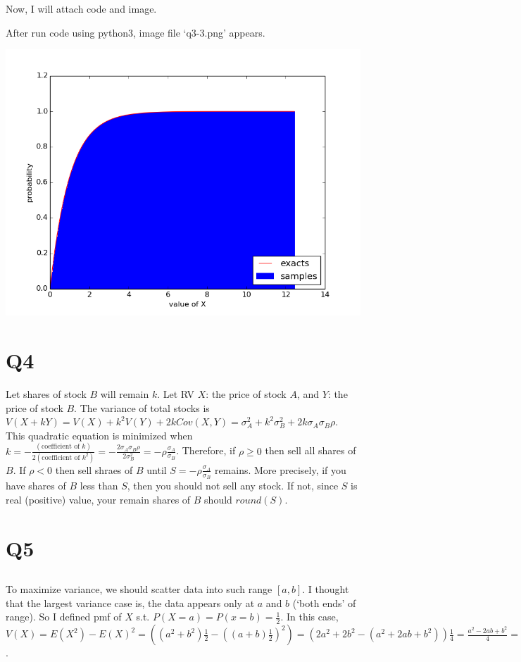 \documentclass{article}
\begin{document}
Now, I will attach code and image.



After run code using python3, image file `q3-3.png' appears.

\includegraphics{./q3-3.png}

\section{Q4}
Let shares of stock $B$ will remain $k$.
Let RV $X$: the price of stock $A$, and $Y$: the price of stock $B$.
The variance of total stocks is
$V(X+kY) = V(X) + k^2V(Y) + 2kCov(X,Y)
= \sigma_A^2 + k^2\sigma_B^2 + 2k\sigma_A\sigma_B\rho$.
This quadratic equation is minimized when
$k=-\frac{(\text{coefficient of }k)}{2(\text{coefficient of }k^2)}
=-\frac{2\sigma_A\sigma_B\rho}{2\sigma_B^2}
=-\rho\frac{\sigma_A}{\sigma_B}$.
Therefore, if $\rho \geq 0$ then sell all shares of $B$.
If $\rho < 0$ then sell shraes of $B$ until $S=-\rho\frac{\sigma_A}{\sigma_B}$ remains.
More precisely, if you have shares of $B$ less than $S$, then you should not sell any stock.
If not, since $S$ is real (positive) value, your remain shares of $B$ should $round(S)$.

\section{Q5}

\subsection{}
To maximize variance, we should scatter data into such range $[a,b]$.
I thought that the largest variance case is, the data appears only at $a$ and $b$ (`both ends' of range).
So I defined pmf of $X$ s.t. $P(X=a)=P(x=b)=\frac{1}{2}$.
In this case,
$V(X) = E(X^2) - E(X)^2
= ((a^2 + b^2)\frac{1}{2} - ((a+b)\frac{1}{2})^2)
= (2a^2+2b^2-(a^2+2ab+b^2))\frac{1}{4}
= \frac{a^2-2ab+b^2}{4}
= \frac{(a-b)^2}{4}$. \\
\end{document}
